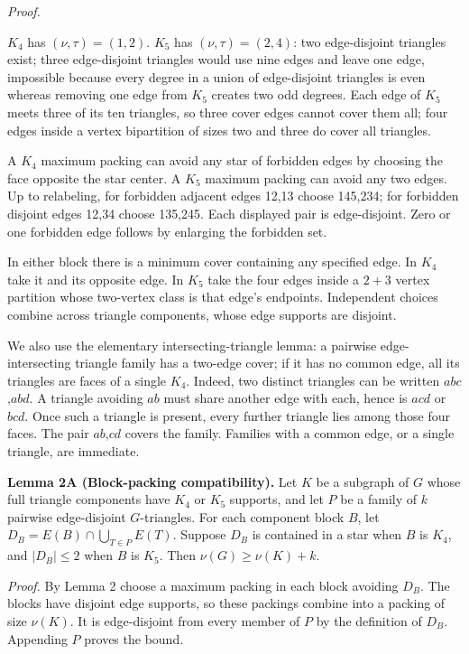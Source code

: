 \documentclass[11pt]{article}
\begin{document}
\emph{Proof.}

\(K_4\) has \((\nu,\tau)=(1,2)\). \(K_5\) has \((\nu,\tau)=(2,4)\): two
edge-disjoint triangles exist; three edge-disjoint triangles would use
nine edges and leave one edge, impossible because every degree in a
union of edge-disjoint triangles is even whereas removing one edge from
\(K_5\) creates two odd degrees. Each edge of \(K_5\) meets three of its
ten triangles, so three cover edges cannot cover them all; four edges
inside a vertex bipartition of sizes two and three do cover all
triangles.

A \(K_4\) maximum packing can avoid any star of forbidden edges by
choosing the face opposite the star center. A \(K_5\) maximum packing
can avoid any two edges. Up to relabeling, for forbidden adjacent edges
12,13 choose 145,234; for forbidden disjoint edges 12,34 choose 135,245.
Each displayed pair is edge-disjoint. Zero or one forbidden edge follows
by enlarging the forbidden set.

In either block there is a minimum cover containing any specified edge.
In \(K_4\) take it and its opposite edge. In \(K_5\) take the four edges
inside a \(2+3\) vertex partition whose two-vertex class is that edge's
endpoints. Independent choices combine across triangle components, whose
edge supports are disjoint.

We also use the elementary intersecting-triangle lemma: a pairwise
edge-intersecting triangle family has a two-edge cover; if it has no
common edge, all its triangles are faces of a single \(K_4\). Indeed,
two distinct triangles can be written \(abc\),\(abd\). A triangle
avoiding \(ab\) must share another edge with each, hence is \(acd\) or
\(bcd\). Once such a triangle is present, every further triangle lies
among those four faces. The pair \(ab\),\(cd\) covers the family.
Families with a common edge, or a single triangle, are immediate.

\textbf{Lemma 2A (Block-packing compatibility).} Let \(K\) be a subgraph
of \(G\) whose full triangle components have \(K_4\) or \(K_5\)
supports, and let \(P\) be a family of \(k\) pairwise edge-disjoint
\(G\)-triangles. For each component block \(B\), let
\(D_B=E(B)\cap\bigcup_{T\in P}E(T)\). Suppose \(D_B\) is contained in a
star when \(B\) is \(K_4\), and \(|D_B|\le2\) when \(B\) is \(K_5\).
Then \(\nu(G)\ge\nu(K)+k\).

\emph{Proof.} By Lemma 2 choose a maximum packing in each block avoiding
\(D_B\). The blocks have disjoint edge supports, so these packings
combine into a packing of size \(\nu(K)\). It is edge-disjoint from
every member of \(P\) by the definition of \(D_B\). Appending \(P\)
proves the bound.
\end{document}
